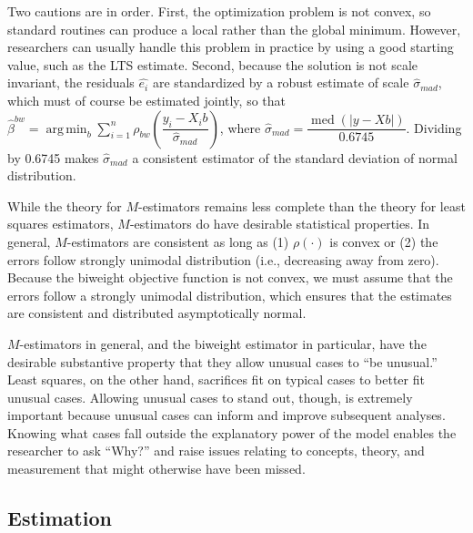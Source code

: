 \documentclass[12pt]{article}
\DeclareMathOperator*{\argmin}{arg\,min}
\DeclareMathOperator{\med}{med}
\begin{document}
Two cautions are in order. 
First, the optimization problem is not convex, so standard routines can produce a local rather than the global minimum. 
However, researchers can usually handle this problem in practice by using a good starting value, such as the LTS estimate. 
Second, because the solution is not scale invariant, the residuals $\hat{e_i}$ are standardized by a robust estimate of scale $\hat{\sigma}_{mad}$, which must of course be estimated jointly, so that $\hat{\beta}^{bw} =\argmin_{b} \sum_{i = 1}^n \rho_{bw}\left(\dfrac{y_i - X_ib}{\hat{\sigma}_{mad}}\right)$, where $\hat{\sigma}_{mad} = \dfrac{\med\left( |y - Xb | \right)}{0.6745}$. 
Dividing by 0.6745 makes $\hat{\sigma}_{mad}$ a consistent estimator of the standard deviation of normal distribution.

While the theory for $M$-estimators remains less complete than the theory for least squares estimators, $M$-estimators do have desirable statistical properties. 
In general, $M$-estimators are consistent as long as (1) $\rho(\cdot)$ is convex or (2) the errors follow strongly unimodal distribution (i.e., decreasing away from zero). 
Because the biweight objective function is not convex, we must assume that the errors follow a strongly unimodal distribution, which ensures that the estimates are consistent and distributed asymptotically normal.

$M$-estimators in general, and the biweight estimator in particular, have the desirable substantive property that they allow unusual cases to ``be unusual.''
Least squares, on the other hand, sacrifices fit on typical cases to better fit unusual cases. 
Allowing unusual cases to stand out, though, is extremely important because unusual cases can inform and improve subsequent analyses. 
Knowing what cases fall outside the explanatory power of the model enables the researcher to ask ``Why?'' and raise issues relating to concepts, theory, and measurement that might otherwise have been missed.

\subsection*{Estimation}
\end{document}
